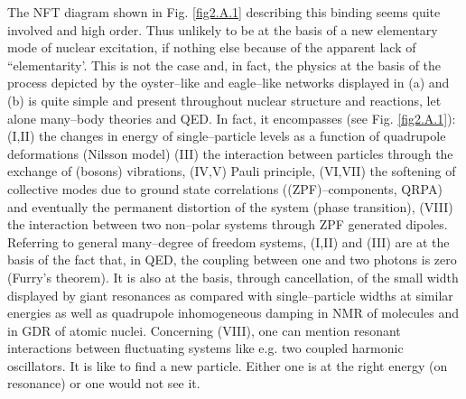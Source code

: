 \begin{subappendices}
The NFT diagram shown in Fig. \ref{fig2.A.1} describing this binding seems quite involved and high order. Thus unlikely to be at the basis of a new elementary mode of nuclear excitation, if nothing else because of the apparent lack of ``elementarity'. This is not the case and, in fact, the physics at the basis of the process depicted by the oyster--like and eagle--like networks displayed in (a) and (b) is quite simple and present throughout nuclear structure and reactions, let alone many--body theories and QED. In fact, it encompasses (see Fig. \ref{fig2.A.1}): (I,II) the changes in energy of single--particle levels as a function of quadrupole deformations (Nilsson model) (III) the interaction between particles through the exchange of (bosons) vibrations, (IV,V) Pauli principle, (VI,VII) the softening of collective modes due to ground state correlations ((ZPF)--components, QRPA) and eventually the permanent distortion of the system (phase transition), (VIII) the interaction between two non--polar systems through ZPF generated dipoles. Referring to general many--degree of freedom systems, (I,II) and (III) are at the basis of the fact that, in QED, the coupling between one and two photons is zero (Furry's theorem). It is also at the basis, through cancellation, of the small width displayed by giant resonances as compared with single--particle widths at similar energies as well as quadrupole inhomogeneous damping   in NMR of molecules  and in GDR of atomic nuclei. Concerning (VIII), one can mention resonant interactions between fluctuating systems like e.g. two coupled harmonic oscillators. It is like to find a new particle. Either one is at the right energy (on resonance) or one would not see it.


\end{subappendices}

